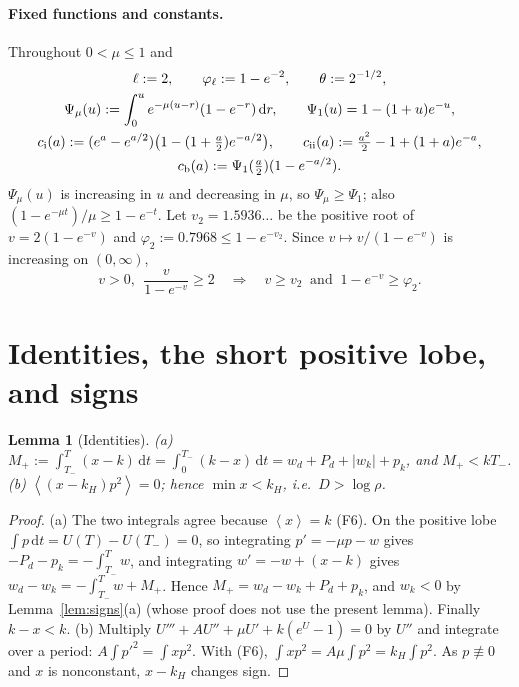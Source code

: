 \documentclass[11pt,a4paper]{article}
\newtheorem{lemma}[theorem]{Lemma}
\theoremstyle{remark}\newtheorem{remark}[theorem]{Remark}
\newcommand{\avg}[1]{\left\langle #1\right\rangle}
\newcommand{\dd}{\,\mathrm d}
\begin{document}
\paragraph{Fixed functions and constants.} Throughout $0<\mu\le1$ and
\begin{gather*}
\ell:=2,\qquad \varphi_\ell:=1-e^{-2},\qquad \theta:=2^{-1/2},\\
\Psi_\mu(u):=\int_0^u e^{-\mu(u-r)}(1-e^{-r})\dd r,\qquad \Psi_1(u)=1-(1+u)e^{-u},\\
c_{\rm i}(a):=(e^a-e^{a/2})\bigl(1-(1+\tfrac a2)e^{-a/2}\bigr),\qquad
c_{\rm ii}(a):=\tfrac{a^2}{2}-1+(1+a)e^{-a},\\
c_{\rm b}(a):=\Psi_1(\tfrac a2)(1-e^{-a/2}).
\end{gather*}
$\Psi_\mu(u)$ is increasing in $u$ and decreasing in $\mu$, so $\Psi_\mu\ge\Psi_1$; also
$(1-e^{-\mu t})/\mu\ge1-e^{-t}$. Let $v_2=1.5936\ldots$ be the positive root of $v=2(1-e^{-v})$ and
$\varphi_2:=0.7968\le 1-e^{-v_2}$. Since $v\mapsto v/(1-e^{-v})$ is increasing on $(0,\infty)$,
\begin{equation}\label{eq:v2}
v>0,\ \ \frac{v}{1-e^{-v}}\ge2\quad\Longrightarrow\quad v\ge v_2\ \text{ and }\ 1-e^{-v}\ge\varphi_2 .
\end{equation}

\section{Identities, the short positive lobe, and signs}
\begin{lemma}[Identities]\label{lem:id}
\textup{(a)} $M_+:=\int_{T_-}^{T}(x-k)\dd t=\int_0^{T_-}(k-x)\dd t=w_d+P_d+|w_k|+p_k$, and
$M_+<kT_-$.
\textup{(b)} $\avg{(x-k_H)p^2}=0$; hence $\min x<k_H$, i.e.\ $D>\log\rho$.
\end{lemma}
\begin{proof}
(a) The two integrals agree because $\avg x=k$ (F6). On the positive lobe $\int p\dd t=U(T)-U(T_-)=0$,
so integrating $p'=-\mu p-w$ gives $-P_d-p_k=-\int_{T_-}^Tw$, and integrating $w'=-w+(x-k)$ gives
$w_d-w_k=-\int_{T_-}^Tw+M_+$. Hence $M_+=w_d-w_k+P_d+p_k$, and $w_k<0$ by Lemma~\ref{lem:signs}(a)
(whose proof does not use the present lemma). Finally $k-x<k$.
(b) Multiply $U'''+AU''+\mu U'+k(e^U-1)=0$ by $U''$ and integrate over a period:
$A\int p'^2=\int xp^2$. With (F6), $\int xp^2=A\mu\int p^2=k_H\int p^2$. As $p\not\equiv0$ and $x$ is
nonconstant, $x-k_H$ changes sign.
\end{proof}
\end{document}
